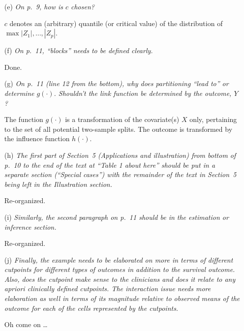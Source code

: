 \documentclass[11pt,a4paper]{article}
\begin{document}
\begin{enumerate}
\begin{itemize}
    \item[(e)] \textit{On p.~9, how is $c$ chosen?}
    
               $c$ denotes an (arbitrary) quantile (or critical value) of the distribution
	       of $\max  |Z_1|, \dots, |Z_p|$.
	       
    \item[(f)] \textit{On p.~11, ``blocks'' needs to be defined clearly.}
               
	       Done.
	       
    \item[(g)] \textit{On p.~11 (line 12 from the bottom), why does partitioning 
               ``lead to'' or determine $g(\cdot)$. Shouldn't the link function be
	       determined by the outcome, $Y$?}
	       
	       The function $g(\cdot)$ is a transformation of the covariate(s) $X$
	       only, pertaining to the set of all potential two-sample splits.
	       The outcome is transformed by the influence function $h(\cdot)$.
	       
    \item[(h)] \textit{The first part of Section~5 (Applications and illustration)
              from bottom of p.~10 to the end of the text at ``Table 1 about here''
	       should be put in a separate section (``Special cases'') with the
	       remainder of the text in Section~5 being left in the Illustration
	       section.}
	       
	       Re-organized.
	       
    \item[(i)] \textit{Similarly, the second paragraph on p.~11 should be in the
               estimation or inference section.}
	       
	       Re-organized.
	       
    \item[(j)] \textit{Finally, the example needs to be elaborated on more in terms
               of different cutpoints for different types of outcomes in addition to
	       the survival outcome. Also, does the cutpoint make sense to the
	       clinicians and does it relate to any apriori clinically defined
	       cutpoints. The interaction issue needs more elaboration as well in
	       terms of its magnitude relative to observed means of the outcome for
	       each of the cells represented by the cutpoints.}
	       
	       Oh come on \dots

  \end{itemize}
  
\end{enumerate}
\end{document}
